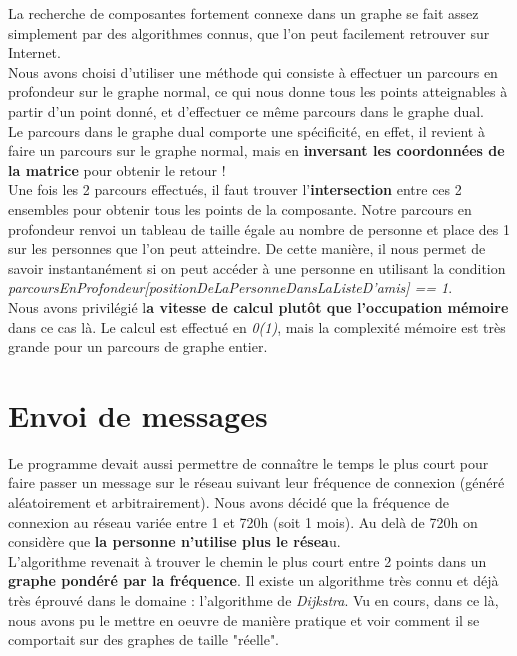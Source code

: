 \documentclass[a4paper, titlepage, oneside]{book}
\begin{document}
	La recherche de composantes fortement connexe dans un graphe se fait assez simplement par des algorithmes connus, que l'on peut facilement retrouver sur Internet.\\
	Nous avons choisi d'utiliser une méthode qui consiste à effectuer un parcours en profondeur sur le graphe normal, ce qui nous donne tous les points atteignables à partir d'un point donné, et d'effectuer ce même parcours dans le graphe dual. \\

	Le parcours dans le graphe dual comporte une spécificité, en effet, il revient à faire un parcours sur le graphe normal, mais en \textbf{inversant les coordonnées de la matrice} pour obtenir le retour !\\

	Une fois les 2 parcours effectués, il faut trouver l'\textbf{intersection} entre ces 2 ensembles pour obtenir tous les points de la composante. Notre parcours en profondeur renvoi un tableau de taille égale au nombre de personne et place des 1 sur les personnes que l'on peut atteindre. De cette manière, il nous permet de savoir instantanément si on peut accéder à une personne en utilisant la condition \emph{parcoursEnProfondeur[positionDeLaPersonneDansLaListeD'amis] == 1}.\\

	Nous avons privilégié l\textbf{a vitesse de calcul plutôt que l'occupation mémoire} dans ce cas là. Le calcul est effectué en \emph{0(1)}, mais la complexité mémoire est très grande pour un parcours de graphe entier.\\
	
\section{Envoi de messages}

Le programme devait aussi permettre de connaître le temps le plus court pour faire passer un message sur le réseau suivant leur fréquence de connexion (généré aléatoirement et arbitrairement). Nous avons décidé que la fréquence de connexion au réseau variée entre 1 et 720h (soit 1 mois). Au delà de 720h on considère que \textbf{la personne n'utilise plus le résea}u.\\

L'algorithme revenait à trouver le chemin le plus court entre 2 points dans un \textbf{graphe pondéré par la fréquence}. Il existe un algorithme très connu et déjà très éprouvé dans le domaine : l'algorithme de \emph{Dijkstra}. Vu en cours, dans ce là, nous avons pu le mettre en oeuvre de manière pratique et voir comment il se comportait sur des graphes de taille "réelle".\\
\end{document}
